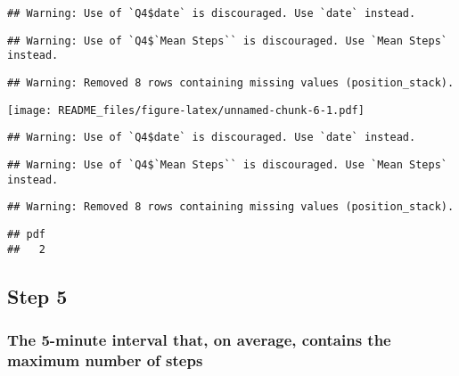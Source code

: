 \documentclass[
]{article}
\newenvironment{Shaded}{\begin{snugshade}}{\end{snugshade}}
\newcommand{\CommentTok}[1]{\textcolor[rgb]{0.56,0.35,0.01}{\textit{#1}}}
\newcommand{\DataTypeTok}[1]{\textcolor[rgb]{0.13,0.29,0.53}{#1}}
\newcommand{\KeywordTok}[1]{\textcolor[rgb]{0.13,0.29,0.53}{\textbf{#1}}}
\newcommand{\NormalTok}[1]{#1}
\newcommand{\OperatorTok}[1]{\textcolor[rgb]{0.81,0.36,0.00}{\textbf{#1}}}
\newcommand{\StringTok}[1]{\textcolor[rgb]{0.31,0.60,0.02}{#1}}
\begin{document}
\begin{verbatim}
## Warning: Use of `Q4$date` is discouraged. Use `date` instead.
\end{verbatim}

\begin{verbatim}
## Warning: Use of `Q4$`Mean Steps`` is discouraged. Use `Mean Steps` instead.
\end{verbatim}

\begin{verbatim}
## Warning: Removed 8 rows containing missing values (position_stack).
\end{verbatim}

\texttt{[image: README\_files/figure-latex/unnamed-chunk-6-1.pdf]}

\begin{verbatim}
## Warning: Use of `Q4$date` is discouraged. Use `date` instead.
\end{verbatim}

\begin{verbatim}
## Warning: Use of `Q4$`Mean Steps`` is discouraged. Use `Mean Steps` instead.
\end{verbatim}

\begin{verbatim}
## Warning: Removed 8 rows containing missing values (position_stack).
\end{verbatim}

\begin{verbatim}
## pdf 
##   2
\end{verbatim}

\hypertarget{step-5}{%
\subsection{Step 5}\label{step-5}}

\hypertarget{the-5-minute-interval-that-on-average-contains-the-maximum-number-of-steps}{%
\subsubsection{The 5-minute interval that, on average, contains the
maximum number of
steps}\label{the-5-minute-interval-that-on-average-contains-the-maximum-number-of-steps}}

\begin{Shaded}
\end{Shaded}
\end{document}
